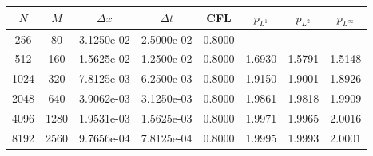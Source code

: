 \begin{tabular}{cccccccc}
\toprule
$N$ & $M$ & $\Delta x$ & $\Delta t$ & CFL & $p_{L^1}$ & $p_{L^2}$ & $p_{L^\infty}$ \\
\midrule
256 & 80 & 3.1250e-02 & 2.5000e-02 & 0.8000 & --- & --- & --- \\
512 & 160 & 1.5625e-02 & 1.2500e-02 & 0.8000 & 1.6930 & 1.5791 & 1.5148 \\
1024 & 320 & 7.8125e-03 & 6.2500e-03 & 0.8000 & 1.9150 & 1.9001 & 1.8926 \\
2048 & 640 & 3.9062e-03 & 3.1250e-03 & 0.8000 & 1.9861 & 1.9818 & 1.9909 \\
4096 & 1280 & 1.9531e-03 & 1.5625e-03 & 0.8000 & 1.9971 & 1.9965 & 2.0016 \\
8192 & 2560 & 9.7656e-04 & 7.8125e-04 & 0.8000 & 1.9995 & 1.9993 & 2.0001 \\
\bottomrule
\end{tabular}